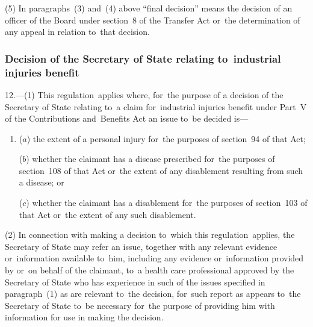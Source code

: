 \documentclass[12pt,a4paper]{article}
\begin{document}
(5) In paragraphs~(3) and~(4) above “final decision” means the decision of an officer of the Board under section~8 of the Transfer Act or~the determination of any appeal in relation to~that decision.


\subsubsection[12. Decision of the Secretary of State relating to~industrial injuries benefit]{Decision of the Secretary of State relating to~industrial injuries benefit}

12.—(1) This regulation~applies where, for~the purpose of a decision of the Secretary of State relating to~a claim for~industrial injuries benefit under Part~V of the Contributions and~Benefits Act an issue to~be decided is—
\begin{enumerate}\item[]
($a$) the extent of a personal injury for~the purposes of section~94 of that Act;

($b$) whether the claimant has a disease prescribed for~the purposes of section~108 of that Act or~the extent of any disablement resulting from such a disease; or

($c$) whether the claimant has a disablement for~the purposes of section~103 of that Act or~the extent of any such disablement.
\end{enumerate}

(2) In connection with making a decision to~which this regulation~applies, the Secretary of State may refer an issue, together with any relevant evidence or~information available to~him, including any evidence or~information provided by or~on behalf of the claimant, to~a 
health care professional approved by the Secretary of State  %
who has experience in such of the issues specified in paragraph~(1) as are relevant to~the decision, for~such report as appears to~the Secretary of State to~be necessary for~the purpose of providing him with information for use in making the decision.
\end{document}
